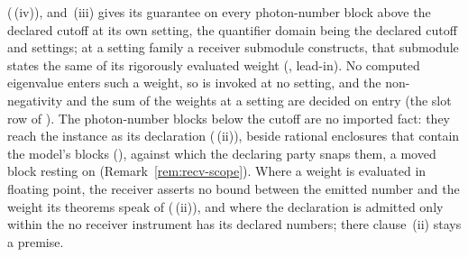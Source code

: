  (\,(iv)), and
\,(iii) gives its guarantee on every
photon-number block above the declared cutoff at its own setting, the
quantifier domain being the declared cutoff and settings; at a setting
family a receiver submodule constructs, that submodule states the same of
its rigorously evaluated weight (,
lead-in). No computed eigenvalue enters such a weight, so
 is invoked at no setting, and the non-negativity and
the sum of the weights at a setting are decided on entry (the slot row of
). The photon-number
blocks below the cutoff are no imported fact: they reach the instance as its
declaration (\,(ii)), beside rational
enclosures that contain the model's blocks
(), against which the declaring party
snaps them, a moved block resting on
 (Remark~\ref{rem:recv-scope}).
Where a weight is evaluated in floating point, the receiver asserts no
bound between the emitted number and the weight its theorems speak of
(\,(ii)), and where the declaration
is admitted only within the  no receiver instrument has
its declared numbers; there clause~(ii) stays a premise.


